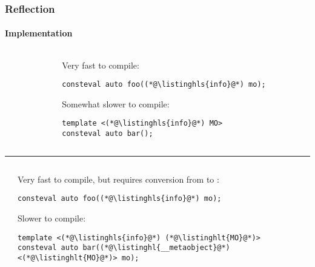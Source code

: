 \documentclass[compress,table,xcolor=table]{beamer}
\begin{document}
\begin{frame}[fragile]
  \frametitle{Reflection}
  \framesubtitle{Implementation}
  \begin{columns}
    \begin{column}{.05\textwidth}
    \end{column}
    \begin{column}{.85\textwidth}
    \normalsize
    Very fast to compile:
    \begin{lstlisting}[language=c++2x,basicstyle=\normalsize\ttfamily]
consteval auto foo((*@\listinghls{info}@*) mo);
    \end{lstlisting}
    Somewhat slower to compile:
    \begin{lstlisting}[language=c++2x,basicstyle=\normalsize\ttfamily]
template <(*@\listinghls{info}@*) MO>
consteval auto bar();
    \end{lstlisting}
    \end{column}
  \end{columns}
  \hrule
  \vfill
  \begin{columns}
    \begin{column}{.05\textwidth}
    \end{column}
    \begin{column}{.85\textwidth}
    \normalsize
    Very fast to compile, but requires  conversion
    from  to :
    \begin{lstlisting}[language=c++2x,basicstyle=\normalsize\ttfamily]
consteval auto foo((*@\listinghls{info}@*) mo);
    \end{lstlisting}
    Slower to compile:
    \begin{lstlisting}[language=c++2x,basicstyle=\small\ttfamily]
template <(*@\listinghls{info}@*) (*@\listinghlt{MO}@*)>
consteval auto bar((*@\listinghl{__metaobject}@*)<(*@\listinghlt{MO}@*)> mo);
    \end{lstlisting}
    \end{column}
  \end{columns}
\end{frame}
\end{document}
